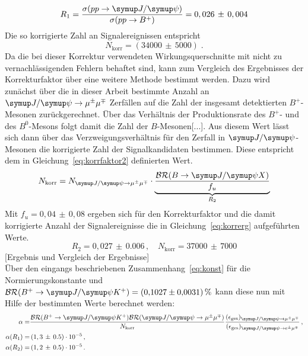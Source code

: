 %
\begin{equation}
  R_1=\frac{\sigma(pp\rightarrow\jpsi)}{\sigma(pp\rightarrow B^+)}=0,026\,\pm\,0,004
  \label{eq:korrfaktor}
\end{equation}
%
Die so korrigierte Zahl an Signalereignissen entspricht
%
\begin{equation}
  N_\text{korr}=(34000\,\pm\,5000)\; .
\end{equation}
%
Da die bei dieser Korrektur verwendeten Wirkungsquerschnitte mit nicht zu vernachlässigenden Fehlern behaftet sind, kann
zum Vergleich des Ergebnisses der Korrekturfaktor über eine weitere Methode bestimmt werden. Dazu wird zunächst über die in
dieser Arbeit bestimmte Anzahl an $\kontroll$ Zerfällen auf die Zahl der insgesamt detektierten $B^{+}$-Mesonen zurückgerechnet. Über das Verhältnis der Produktionsrate des $B^{+}$- und des $B^{0}$-Mesons folgt damit die Zahl der
$B$-Mesonen[...]. Aus diesem Wert lässt sich dann über das Verzweigungsverhältnis für den Zerfall in $\jpsi$-Mesonen die korrigierte Zahl der Signalkandidaten bestimmen. Diese entspricht dem in Gleichung~\eqref{eq:korrfaktor2} definierten Wert.
%
\begin{equation}
  N_\text{korr}=N_{\kontroll}\cdot\underbrace{\frac{\mathcal{BR}(B\rightarrow\jpsi X)}{f_u}}_{R_2}
  \label{eq:korrfaktor2}
\end{equation}
%
Mit $f_u=0,04\,\pm\,0,08$ \cite{pdg} ergeben sich für den Korrekturfaktor und die damit korrigierte Anzahl der Signalereignisse die in Gleichung~\ref{eq:korrerg} aufgeführten Werte.
%
\begin{equation}
  R_2=0,027\,\pm\,0.006\, , \quad N_\text{korr}=37000\,\pm\,7000
  \label{eq:korrerg}
\end{equation}
%
[Ergebnis und Vergleich der Ergebnisse]\\
Über den eingangs beschriebenen Zusammenhang~\eqref{eq:konst} für die Normierungskonstante und $\mathcal{BR}(B^{+}\rightarrow\jpsi K^{+}) = \SI{0.1027(31)}{\percent}$ \cite{pdg} kann diese nun mit Hilfe der bestimmten Werte berechnet werden:
%
\begin{align*}
  \alpha=&\frac{\mathcal{BR}(B^{+}\rightarrow\jpsi K^{+})\mathcal{BR}(\kontroll)}{N_\text{korr}}\frac{(\epsilon_{\text{ges}})_{\kontroll}}{(\epsilon_{\text{ges}})_{\signal}}\, , \\
  \alpha(R_1)=&\,(1,3\,\pm\,0.5)\cdot10^{-5} \, , \\
  \alpha(R_2)=&\,(1,2\,\pm\,0.5)\cdot10^{-5} \, .
\end{align*}
